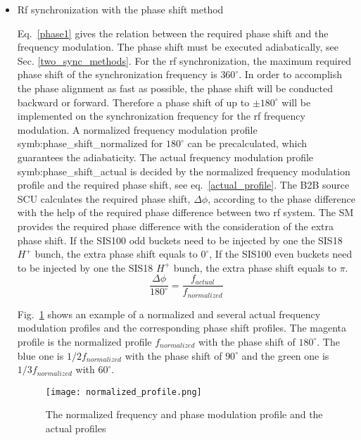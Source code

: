 \begin{itemize}
\item Rf synchronization with the phase shift method

 
Eq.~\ref{phase1} gives the relation between the required phase shift and the frequency modulation. The phase shift must be executed adiabatically, see Sec. \ref{two_sync_methods}. For the rf synchronization, the maximum required phase shift of the synchronization frequency is $360^\circ$. In order to accomplish the phase alignment as fast as possible, the phase shift will be conducted backward or forward. Therefore a phase shift of up to $\pm 180^\circ$ will be implemented on the synchronization frequency for the rf frequency modulation. A normalized frequency modulation profile \gls{symb:phase_shift_normalized} for $180^\circ$ can be precalculated, which guarantees the adiabaticity. The actual frequency modulation profile \gls{symb:phase_shift_actual} is decided by the normalized frequency modulation profile and the required phase shift, see eq.~\ref{actual_profile}. The B2B source SCU calculates the required phase shift, $\Delta \phi$, according to the phase difference with the help of the required phase difference between two rf system. The SM provides the required phase difference with the consideration of the extra phase shift. If the SIS100 odd buckets need to be injected by one the SIS18 $H^+$ bunch, the extra phase shift equals to $0^\circ$, If the SIS100 even buckets need to be injected by one the SIS18 $H^+$ bunch, the extra phase shift equals to $\pi$. 
\begin{equation}
\frac{\Delta \phi}{180^\circ}= \frac{f_{\mathit{actual}}}{f_{\mathit{normalized}}} \label{actual_profile}
\end{equation}

Fig.~\ref{normalized_profile} shows an example of a normalized and several actual frequency  modulation profiles and the corresponding phase shift profiles. The magenta profile is the normalized profile $f_{normalized}$ with the phase shift of $180^\circ$. The blue one is $1/2 f_{\mathit{normalized}}$ with the phase shift of $90^\circ$ and the green one is $1/3 f_{\mathit{normalized}}$ with $60^\circ$. 
\begin{figure}[!htb]
   \centering   
   \texttt{[image: normalized\_profile.png]}
   \caption{The normalized frequency and phase modulation profile and the actual profiles}
   \label{normalized_profile}
\end{figure}  


\end{itemize}
